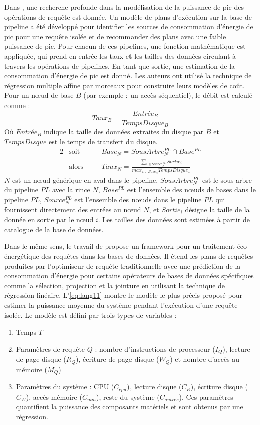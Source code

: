 Dans \cite{Kunjir12}, une recherche profonde dans la modélisation de la puissance de pic des opérations de requête est donnée. Un modèle de plans d'exécution sur la base de pipeline a été développé pour identifier les sources de consommation d'énergie de pic pour une requête isolée et de recommander des plans avec une faible puissance de pic. Pour chacun de ces pipelines, une fonction mathématique est appliquée, qui prend en entrée les taux et les tailles des données circulant à travers les opérations de pipelines. En tant que sortie, une estimation de la consommation d'énergie de pic est donné. Les auteurs ont utilisé la technique de régression multiple affine par morceaux pour construire leurs modèles de coût. Pour un nœud de base $B$ (par exemple : un accès séquentiel), le débit est calculé comme :
\begin{equation}
 Taux_B = \frac{Entrée_B}{TempsDisque_B}
\end{equation}
Où $Entrée_B$ indique la taille des données extraites du disque par $B$ et $TempsDisque$ est le temps de transfert du disque.
\begin{alignat}{2}
& \text{soit}  \quad && Base_N = SousArbre^{PL}_{N} \cap Base^{PL} \nonumber \\
& \text{alors} \quad && Taux_N = \frac{\sum_{i \in Source^{PL}_{N}} Sortie_i}{max_{x \in Base_N} TempsDisque_x}
\end{alignat}
$N$ est un nœud générique en aval dans le pipeline, $SousArbre^{PL}_{N}$ est le sous-arbre du pipeline $PL$ avec la rince $N$, $Base^{PL}$ est l'ensemble des nœuds de bases dans le pipeline $PL$, $Source^{PL}_{N}$ est l'ensemble des nœuds dans le pipeline $PL$ qui fournissent directement des entrées au nœud $N$, et $Sortie_i$ désigne la taille de la donnée en sortie par le nœud $i$. Les tailles des données sont estimées à partir de catalogue de la base de données.

Dans le même sens, le travail de \cite{Lang11} propose un framework pour un traitement éco-énergétique des requêtes dans les bases de données. Il étend les plans de requêtes produites par l'optimiseur de requête traditionnelle avec une prédiction de la consommation d'énergie pour certains opérateurs de bases de données spécifiques comme la sélection, projection et la jointure en utilisant la technique de régression linéaire. L'\ref{eq:lang11} montre le modèle le plus précis proposé pour estimer la puissance moyenne du système pendant l'exécution d'une requête isolée. Le modèle est défini par trois types de variables :
\begin{enumerate}
 \item Temps $T$
 \item Paramètres de requête $Q$ : nombre d'instructions de processeur ($I_Q$), lecture de page disque ($R_Q$), écriture de page disque ($W_Q$) et nombre d'accès au mémoire ($M_Q$)
 \item Paramètres du système : CPU ($C_{cpu}$), lecture disque ($C_R$), écriture disque ($C_W$), accès mémoire ($C_{mm}$), reste du système ($C_{autres}$). Ces paramètres quantifient la puissance des composants matériels et sont obtenus par une régression.
\end{enumerate}

